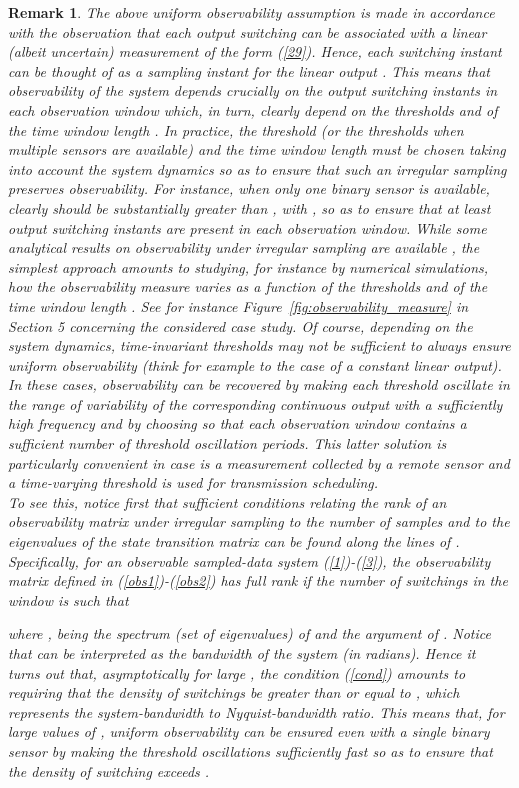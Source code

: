 \documentclass[11pt,journal,onecolumn]{IEEEtran}
\newtheorem{remark}{Remark}
\begin{document}
\begin{remark}
The above uniform observability assumption is made in accordance with the observation that each output switching can be associated with a linear (albeit uncertain) measurement of the form  (\ref{29}).  Hence, each switching instant  can be thought of as a sampling instant for the linear output .
This means that observability of the system depends crucially on the output switching instants in each observation window which, in turn, clearly depend on the thresholds and of the time window length . In practice, the threshold (or the thresholds when multiple sensors are available)  and the time window length  must be chosen taking into account the system dynamics so as to ensure that such an irregular sampling preserves observability. For instance, when only one binary sensor is available, clearly  should be substantially greater than , with , so as to ensure that at least  output switching instants are present in each observation window. While some analytical results on observability under irregular sampling are available \cite{Irr-sampling}, the simplest approach amounts to studying, for instance by numerical simulations, how the observability measure  varies as a function of the thresholds and of the time window length . See for instance Figure~\ref{fig:observability_measure} in Section 5 concerning the considered case study. Of course, depending on the system dynamics, time-invariant thresholds may not be sufficient to always ensure uniform observability (think for example to the case of a constant linear output). In these cases, observability can be recovered by making each threshold oscillate in the range of variability of the corresponding continuous output  with a sufficiently high frequency  and by choosing  so that each observation window contains a sufficient number of threshold oscillation periods. This latter solution is particularly convenient in case  is a measurement collected by a remote sensor and a time-varying threshold  is used for transmission scheduling. \\ To see this, notice first that sufficient conditions relating the rank of an observability matrix under irregular sampling to the number of samples and to the eigenvalues of the state transition matrix can be found along the lines of \cite{Irr-sampling}. Specifically, for an observable sampled-data system (\ref{1})-(\ref{3}), the observability matrix  defined in (\ref{obs1})-(\ref{obs2}) has full rank  if the number of switchings  in the window  is such that

where ,  being the spectrum (set of eigenvalues) of  and 
the argument of . Notice that  can be interpreted as the bandwidth of the system (in radians).
Hence it turns out that, asymptotically for large , the condition (\ref{cond}) amounts to requiring that the density of switchings  be greater than or equal to , which represents the system-bandwidth to Nyquist-bandwidth ratio. This means that, for large values of , uniform observability can be ensured even with a single binary sensor by making the threshold oscillations sufficiently fast so as to ensure that the density of switching exceeds .
\end{remark}
\end{document}
